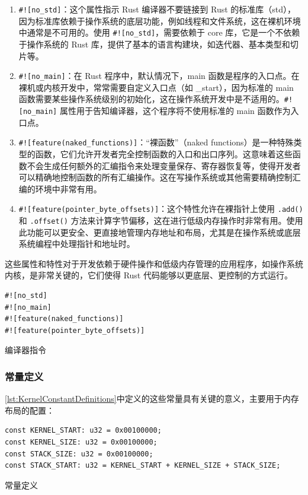 \begin{enumerate}
    \item \texttt{\#![no\_std]}：这个属性指示 Rust 编译器不要链接到 Rust 的标准库（std），因为标准库依赖于操作系统的底层功能，例如线程和文件系统，这在裸机环境中通常是不可用的。使用 \texttt{\#![no\_std]}，需要依赖于 core 库，它是一个不依赖于操作系统的 Rust 库，提供了基本的语言构建块，如迭代器、基本类型和切片等。
    \item \texttt{\#![no\_main]}：在 Rust 程序中，默认情况下，main 函数是程序的入口点。在裸机或内核开发中，常常需要自定义入口点（如 \_start），因为标准的 main 函数需要某些操作系统级别的初始化，这在操作系统开发中是不适用的。\texttt{\#![no\_main]} 属性用于告知编译器，这个程序将不使用标准的 main 函数作为入口点。
    \item \texttt{\#![feature(naked\_functions)]}：“裸函数”（naked functions）是一种特殊类型的函数，它们允许开发者完全控制函数的入口和出口序列。这意味着这些函数不会生成任何额外的汇编指令来处理变量保存、寄存器恢复等，使得开发者可以精确地控制函数的所有汇编操作。这在写操作系统或其他需要精确控制汇编的环境中非常有用。
    \item \texttt{\#![feature(pointer\_byte\_offsets)]}：这个特性允许在裸指针上使用 \texttt{.add()} 和 \texttt{.offset()} 方法来计算字节偏移，这在进行低级内存操作时非常有用。使用此功能可以更安全、更直接地管理内存地址和布局，尤其是在操作系统或底层系统编程中处理指针和地址时。
\end{enumerate}

这些属性和特性对于开发依赖于硬件操作和低级内存管理的应用程序，如操作系统内核，是非常关键的，它们使得 Rust 代码能够以更底层、更控制的方式运行。

\begin{listing}[htbp]
    \begin{verbatim}
#![no_std]
#![no_main]
#![feature(naked_functions)]
#![feature(pointer_byte_offsets)]
    \end{verbatim}
    \caption{编译器指令}\label{lst:CompilerDirectives}
\end{listing}

\subsubsection{常量定义}

\cref{lst:KernelConstantDefinitions}中定义的这些常量具有关键的意义，主要用于内存布局的配置：

\begin{listing}[htbp]
    \begin{verbatim}
const KERNEL_START: u32 = 0x00100000;
const KERNEL_SIZE: u32 = 0x00100000;
const STACK_SIZE: u32 = 0x00100000;
const STACK_START: u32 = KERNEL_START + KERNEL_SIZE + STACK_SIZE;
    \end{verbatim}
    \caption{常量定义}\label{lst:KernelConstantDefinitions}
\end{listing}

